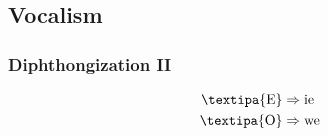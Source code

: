 \documentclass{report}[12pt]
\begin{document}
\subsection{Vocalism}

\subsubsection{Diphthongization II}\label{sec:diphthongization_2}

\begin{tcolorbox}
  \begin{align*}  
    \text{\textipa{E}} & \Rightarrow \text{ie} \\
    \text{\textipa{O}} & \Rightarrow \text{we} \\
  \end{align*}
\end{tcolorbox}
\end{document}
